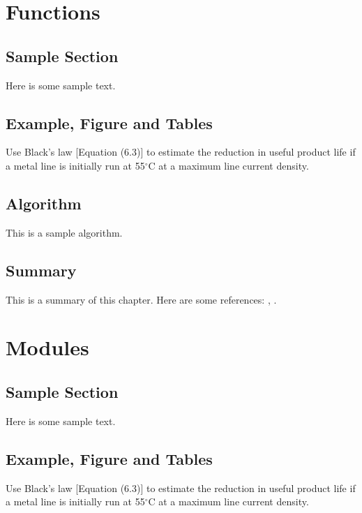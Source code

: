 \documentclass{wileySix}
\begin{document}
\chapter{Functions}

\section{Sample Section}
Here is some sample text.

\section{Example, Figure and Tables}
\vskip6pt
\begin{example}
	Use Black's law [Equation (6.3)] to estimate the reduction in useful product
	life if a metal line is initially run at 55$^\circ$C at a maximum line
	current density.
\end{example}

\section{Algorithm}
This is a sample algorithm.

\section{Summary}
This is a summary of this chapter.
Here are some references: \cite{xkilby}, \cite{xberen}.

\chapter{Modules}

\section{Sample Section}
Here is some sample text.

\section{Example, Figure and Tables}
\vskip6pt
\begin{example}
	Use Black's law [Equation (6.3)] to estimate the reduction in useful product
	life if a metal line is initially run at 55$^\circ$C at a maximum line
	current density.
\end{example}
\end{document}
